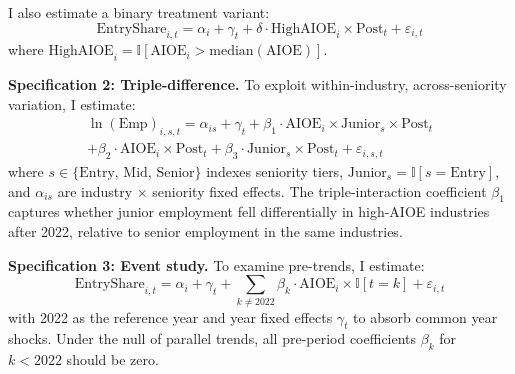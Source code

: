 \documentclass[12pt]{article}
\newcommand{\ind}{\mathbb{I}}
\begin{document}
I also estimate a binary treatment variant:
\begin{equation}
\text{EntryShare}_{i,t} = \alpha_i + \gamma_t + \delta \cdot \text{HighAIOE}_i \times \text{Post}_t + \varepsilon_{i,t}
\label{eq:did_binary}
\end{equation}
where $\text{HighAIOE}_i = \ind[\text{AIOE}_i > \text{median}(\text{AIOE})]$.

\textbf{Specification 2: Triple-difference.} To exploit within-industry, across-seniority variation, I estimate:
\begin{multline}
\ln(\text{Emp})_{i,s,t} = \alpha_{is} + \gamma_t + \beta_1 \cdot \text{AIOE}_i \times \text{Junior}_s \times \text{Post}_t \\
+ \beta_2 \cdot \text{AIOE}_i \times \text{Post}_t + \beta_3 \cdot \text{Junior}_s \times \text{Post}_t + \varepsilon_{i,s,t}
\label{eq:ddd}
\end{multline}
where $s \in \{\text{Entry, Mid, Senior}\}$ indexes seniority tiers, $\text{Junior}_s = \ind[s = \text{Entry}]$, and $\alpha_{is}$ are industry $\times$ seniority fixed effects. The triple-interaction coefficient $\beta_1$ captures whether junior employment fell differentially in high-AIOE industries after 2022, relative to senior employment in the same industries.

\textbf{Specification 3: Event study.} To examine pre-trends, I estimate:
\begin{equation}
\text{EntryShare}_{i,t} = \alpha_i + \gamma_t + \sum_{k \neq 2022} \beta_k \cdot \text{AIOE}_i \times \ind[t = k] + \varepsilon_{i,t}
\label{eq:eventstudy}
\end{equation}
with 2022 as the reference year and year fixed effects $\gamma_t$ to absorb common year shocks. Under the null of parallel trends, all pre-period coefficients $\beta_k$ for $k < 2022$ should be zero.
\end{document}

